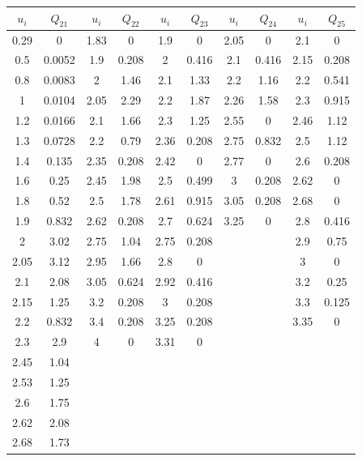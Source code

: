 \documentclass{report}
\begin{document}
\begin{tabular}{|c|c||c|c||c|c||c|c||c|c|}
\hline 
$u_i$ & $Q_{21}$ & $u_i$ & $Q_{22}$ & $u_i$ & $Q_{23}$ & $u_i$ & $Q_{24}$ & $u_i$ & $Q_{25}$ \\
\hline 
0.29 & 0      & 1.83  & 0     & 1.9  & 0     & 2.05 & 0     & 2.1  & 0     \\
0.5  & 0.0052 & 1.9   & 0.208 & 2    & 0.416 & 2.1  & 0.416 & 2.15 & 0.208 \\
0.8  & 0.0083 & 2     & 1.46  & 2.1  & 1.33  & 2.2  & 1.16  & 2.2  & 0.541 \\
1    & 0.0104 & 2.05  & 2.29  & 2.2  & 1.87  & 2.26 & 1.58  & 2.3  & 0.915 \\
1.2  & 0.0166 & 2.1   & 1.66  & 2.3  & 1.25  & 2.55 & 0     & 2.46 & 1.12  \\
1.3  & 0.0728 & 2.2   & 0.79  & 2.36 & 0.208 & 2.75 & 0.832 & 2.5  & 1.12  \\
1.4  & 0.135  & 2.35  & 0.208 & 2.42 & 0     & 2.77 & 0     & 2.6  & 0.208 \\
1.6  & 0.25   & 2.45  & 1.98  & 2.5  & 0.499 & 3    & 0.208 & 2.62 & 0     \\
1.8  & 0.52   & 2.5   & 1.78  & 2.61 & 0.915 & 3.05 & 0.208 & 2.68 & 0     \\
1.9  & 0.832  & 2.62  & 0.208 & 2.7  & 0.624 & 3.25 & 0     & 2.8  & 0.416 \\
2    & 3.02   & 2.75  & 1.04  & 2.75 & 0.208 &      &       & 2.9  & 0.75  \\
2.05 & 3.12   & 2.95  & 1.66  & 2.8  & 0     &      &       & 3    & 0     \\
2.1  & 2.08   & 3.05  & 0.624 & 2.92 & 0.416 &      &       & 3.2  & 0.25  \\
2.15 & 1.25   & 3.2   & 0.208 & 3    & 0.208 &      &       & 3.3  & 0.125 \\
2.2  & 0.832  & 3.4   & 0.208 & 3.25 & 0.208 &      &       & 3.35 & 0     \\
2.3  & 2.9    & 4     & 0     & 3.31 & 0     &      &       &      &       \\
2.45 & 1.04   &       &       &      &       &      &       &      &       \\
2.53 & 1.25   &       &       &      &       &      &       &      &       \\ 
2.6  & 1.75   &       &       &      &       &      &       &      &       \\ 
2.62 & 2.08   &       &       &      &       &      &       &      &       \\ 
2.68 & 1.73   &       &       &      &       &      &       &      &       \\ 

\end{tabular}
\end{document}
